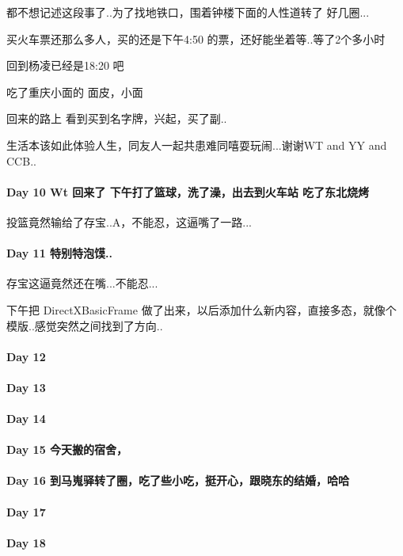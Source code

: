 \documentclass[UTF8,a4paper,8pt]{ctexbook}
\begin{document}
	 	  都不想记述这段事了..为了找地铁口，围着钟楼下面的人性道转了 好几圈...
	 	  
	 	  买火车票还那么多人，买的还是下午4:50 的票，还好能坐着等..等了2个多小时
	 	  
	 	  回到杨凌已经是18:20 吧
	 	  
	 	  吃了重庆小面的 面皮，小面
	 	  
	 	  回来的路上 看到买到名字牌，兴起，买了副..
	 	  
	 	  生活本该如此体验人生，同友人一起共患难同嘻耍玩闹...谢谢WT and YY and CCB..
 	 \paragraph{Day 10   Wt 回来了   \quad   下午打了篮球，洗了澡，出去到火车站 吃了东北烧烤}
	 	 投篮竟然输给了存宝..A，不能忍，这逼嘴了一路...
 	 \paragraph{Day 11      \quad    	特别特泡馍.. }
	 	 存宝这逼竟然还在嘴...不能忍...
	 	 
	 	 下午把 DirectXBasicFrame 做了出来，以后添加什么新内容，直接多态，就像个模版..感觉突然之间找到了方向..
 	 \paragraph{Day 12      \quad     }
 	 \paragraph{Day 13      \quad     }
 	 \paragraph{Day 14      \quad     }
 	 \paragraph{Day 15      \quad  今天搬的宿舍，    }
 	 \paragraph{Day 16      \quad  到马嵬驿转了圈，吃了些小吃，挺开心，跟晓东的结婚，哈哈 }
 	 \paragraph{Day 17      \quad     }
 	 \paragraph{Day 18      \quad     }
\end{document}
